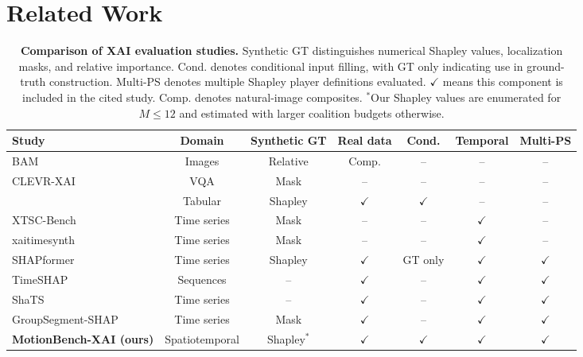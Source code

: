\section{Related Work}
\label{sec:related}

\begin{table}[t]
\centering
\label{tab:related_bench}
\caption{\textbf{Comparison of XAI evaluation studies.} Synthetic GT distinguishes numerical Shapley values, localization masks, and relative importance. Cond. denotes conditional input filling, with GT only indicating use in ground-truth construction. Multi-PS denotes
multiple Shapley player definitions evaluated.
$\checkmark$ means this component is included in the cited study. Comp. denotes natural-image composites. $^*$Our Shapley values are enumerated for $M\le12$ and estimated with larger coalition budgets otherwise.}
\setlength{\tabcolsep}{3pt}
\scriptsize
\begin{tabular*}{\linewidth}{@{\extracolsep{\fill}}lcccccc@{}}
\toprule
Study & Domain & Synthetic GT & Real data & Cond. & Temporal & Multi-PS \\
\midrule
BAM~\citep{Yang2019BenchmarkingAM}
 & Images & Relative & Comp. & -- & -- & -- \\
CLEVR-XAI~\citep{arras2022clevr}
 & VQA & Mask & -- & -- & -- & -- \\
\citet{olsen2024comparative}
 & Tabular & Shapley & $\checkmark$ & $\checkmark$ & -- & -- \\
XTSC-Bench~\citep{hollig2023xtsc}
 & Time series & Mask & -- & -- & $\checkmark$ & -- \\
xaitimesynth~\citep{baer2026xaitimesynth}
 & Time series & Mask & -- & -- & $\checkmark$ & -- \\
SHAPformer~\citep{hertel2026shapformer}
 & Time series & Shapley & $\checkmark$ & GT only & $\checkmark$ & $\checkmark$ \\
TimeSHAP~\citep{bento2021timeshap}
 & Sequences & -- & $\checkmark$ & -- & $\checkmark$ & $\checkmark$ \\
ShaTS~\citep{de2025shats}
 & Time series & -- & $\checkmark$ & -- & $\checkmark$ & $\checkmark$ \\
GroupSegment-SHAP~\citep{kim2026groupsegment}
 & Time series & Mask & $\checkmark$ & -- & $\checkmark$ & $\checkmark$ \\
\midrule
\textbf{MotionBench-XAI (ours)}
 & Spatiotemporal & Shapley$^*$ & $\checkmark$ & $\checkmark$ & $\checkmark$ & $\checkmark$ \\
\bottomrule
\end{tabular*}
\label{tab:related_bench}
\end{table}

